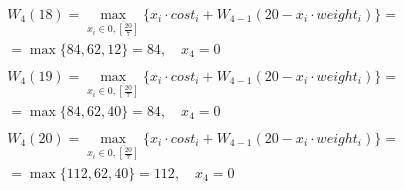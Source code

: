 \documentclass[17pt]{extarticle}
\begin{document}
\[
    \begin{aligned}
         & W_4(18)=\max_{x_i \in \overline{0, \left[\frac{20}{7}\right]}} \{x_i \cdot cost_i + W_{4-1}(20 - x_i \cdot weight_i)\}= \\& = \max \{
        84, 62, 12\}= 84, \quad x_4 = 0                                                                                            \\
    \end{aligned}
\]
\[
    \begin{aligned}
         & W_4(19)=\max_{x_i \in \overline{0, \left[\frac{20}{7}\right]}} \{x_i \cdot cost_i + W_{4-1}(20 - x_i \cdot weight_i)\}= \\& = \max \{
        84, 62, 40\}= 84, \quad x_4 = 0                                                                                            \\
    \end{aligned}
\]
\[
    \begin{aligned}
         & W_4(20)=\max_{x_i \in \overline{0, \left[\frac{20}{7}\right]}} \{x_i \cdot cost_i + W_{4-1}(20 - x_i \cdot weight_i)\}= \\& = \max \{
        112, 62, 40\}= 112, \quad x_4 = 0                                                                                          \\
    \end{aligned}
\]
\end{document}
